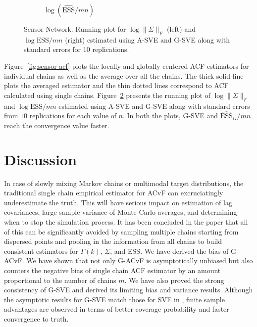 \documentclass[11pt]{article}
\theoremstyle{remark}
\begin{document}
\begin{figure}
\begin{subfigure}[h]{0.4\textwidth}
      \caption{$\log(\widehat{\textrm{ESS}}/mn)$}
      \label{subfig:sensor-ess}
    \end{subfigure}
    \caption{Sensor Network. Running plot for $\log \|{\Sigma}\|_F$ (left) and $\log {\textrm{ESS}}/mn$ (right) estimated using A-SVE and G-SVE along with standard errors for 10 replications.}
    \label{fig:sensor-frob_n_ess}
\end{figure}

Figure~\ref{fig:sensor-acf} plots the locally and globally centered ACF estimators for individual chains  as well as the average over all the chains. The thick solid line plots the averaged estimator and the thin dotted lines correspond to ACF calculated using single chains. Figure~\ref{fig:sensor-frob_n_ess} presents the running plot of $\log \|{\Sigma}\|_F$ and $\log \textrm{ESS}/mn$ estimated using A-SVE and G-SVE along with standard errors from $10$ replications for each value of $n$. In both the plots, G-SVE and $\widehat{\textrm{ESS}}_G/mn$ reach the convergence value faster.

 
\section{Discussion} \label{sec:discussion}


In case of slowly mixing Markov chains or multimodal target distributions, the traditional single chain empirical estimator for ACvF can excruciatingly underestimate the truth. This will have serious impact on estimation of lag covariances, large sample variance of Monte Carlo averages, and determining when to stop the simulation process. It has been concluded in the paper that all of this can be significantly avoided by sampling multiple chains starting from dispersed points and pooling in the information from all chains to build consistent estimators for $\Gamma(k)$, $\Sigma$, and ESS. We have derived the bias of G-ACvF. We have shown that not only G-ACvF is asymptotically unbiased but also counters the negative bias of single chain ACF estimator by an amount proportional to the number of chains $m$. We have also proved the strong consistency of G-SVE and derived its limiting bias and variance results. Although the asymptotic results for G-SVE match those for SVE in \cite{andr:1991}, finite sample advantages are observed in terms of better coverage probability and faster convergence to truth.  



\end{document}
